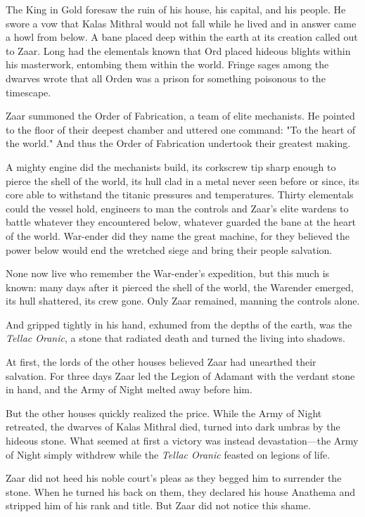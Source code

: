 \documentclass[10pt,a4paper,twoside,bg=print,twocolumn,openany,nodeprecatedcode]{dndbook}
\begin{document}
The King in Gold foresaw the ruin of his house, his capital, and his people. He swore a vow that Kalas Mithral would not fall while he lived and in answer came a howl from below. A bane placed deep within the earth at its creation called out to Zaar. Long had the elementals known that Ord placed hideous blights within his masterwork, entombing them within the world. Fringe sages among the dwarves wrote that all Orden was a prison for something poisonous to the timescape.

Zaar summoned the Order of Fabrication, a team of elite mechanists. He pointed to the floor of their deepest chamber and uttered one command: "To the heart of the world." And thus the Order of Fabrication undertook their greatest making.

A mighty engine did the mechanists build, its corkscrew tip sharp enough to pierce the shell of the world, its hull clad in a metal never seen before or since, its core able to withstand the titanic pressures and temperatures. Thirty elementals could the vessel hold, engineers to man the controls and Zaar's elite wardens to battle whatever they encountered below, whatever guarded the bane at the heart of the world. War-ender did they name the great machine, for they believed the power below would end the wretched siege and bring their people salvation.

None now live who remember the War-ender's expedition, but this much is known: many days after it pierced the shell of the world, the Warender emerged, its hull shattered, its crew gone. Only Zaar remained, manning the controls alone.

And gripped tightly in his hand, exhumed from the depths of the earth, was the \textit{Tellac Oranic}, a stone that radiated death and turned the living into shadows.

At first, the lords of the other houses believed Zaar had unearthed their salvation. For three days Zaar led the Legion of Adamant with the verdant stone in hand, and the Army of Night melted away before him.

But the other houses quickly realized the price. While the Army of Night retreated, the dwarves of Kalas Mithral died, turned into dark umbras by the hideous stone. What seemed at first a victory was instead devastation—the Army of Night simply withdrew while the \textit{Tellac Oranic} feasted on legions of life.

Zaar did not heed his noble court's pleas as they begged him to surrender the stone. When he turned his back on them, they declared his house Anathema and stripped him of his rank and title. But Zaar did not notice this shame.
\end{document}
